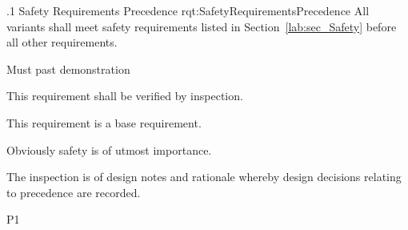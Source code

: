 \ONERQMTV
{\RqtNumberBase.1}
{Safety Requirements Precedence}
{rqt:SafetyRequirementsPrecedence}
{All \ThisSystem variants shall meet safety requirements listed in Section~\ref{lab:sec_Safety} before all other requirements.}
{
	\item [Phase 1] Must past demonstration
}
{This requirement shall be verified by inspection.}
{
	\item [N/A] This requirement is a base requirement.
}
{
	\item Obviously safety is of utmost importance.
	\item The inspection is of design notes and rationale whereby design decisions relating to precedence are recorded.
}
{P1}

